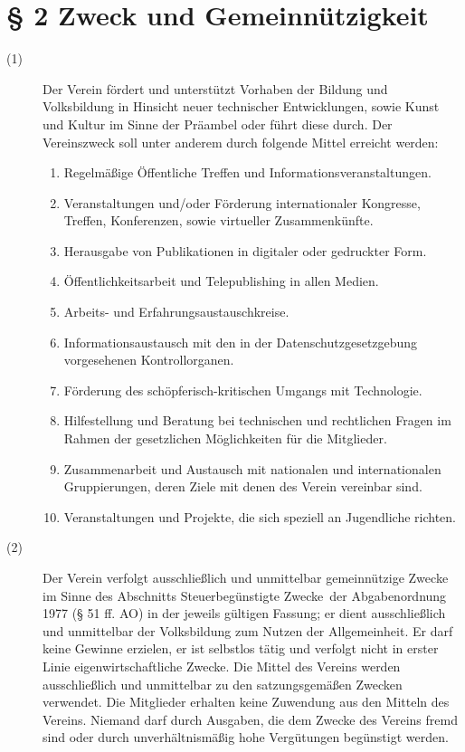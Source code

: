 \documentclass[12pt,paper=a4,ngerman]{scrreprt}
\begin{document}
\section{\S{} 2 Zweck und Gemeinnützigkeit}
\begin{description}
	\item[(1)] Der Verein fördert und unterstützt Vorhaben der Bildung und Volksbildung in Hinsicht neuer technischer Entwicklungen, sowie Kunst und Kultur im Sinne der Präambel oder führt diese durch. Der Vereinszweck soll unter anderem durch folgende Mittel erreicht werden:
	\begin{enumerate}
		\item Regelmäßige Öffentliche Treffen und Informationsveranstaltungen.
		\item Veranstaltungen und/oder Förderung internationaler Kongresse, Treffen, Konferenzen, sowie virtueller Zusammenkünfte.
		\item Herausgabe von Publikationen in digitaler oder gedruckter Form.
		\item Öffentlichkeitsarbeit und Telepublishing in allen Medien.
		\item Arbeits- und Erfahrungsaustauschkreise.
		\item Informationsaustausch mit den in der Datenschutzgesetzgebung vorgesehenen Kontrollorganen.
		\item Förderung des schöpferisch-kritischen Umgangs mit Technologie.
		\item Hilfestellung und Beratung bei technischen und rechtlichen Fragen im Rahmen der gesetzlichen Möglichkeiten für die Mitglieder.
		\item Zusammenarbeit und Austausch mit nationalen und internationalen Gruppierungen, deren Ziele mit denen des Verein vereinbar sind.
		\item Veranstaltungen und Projekte, die sich speziell an Jugendliche richten.
	\end{enumerate}
\item[(2)] Der Verein verfolgt ausschließlich und unmittelbar gemeinnützige Zwecke im Sinne des Abschnitts \glqq Steuerbegünstigte Zwecke\grqq ~der Abgabenordnung 1977 (§ 51 ff. AO) in der jeweils gültigen Fassung; er dient ausschließlich und unmittelbar der Volksbildung zum Nutzen der Allgemeinheit. Er darf keine Gewinne erzielen, er ist selbstlos tätig und verfolgt nicht in erster Linie eigenwirtschaftliche Zwecke. Die Mittel des Vereins werden ausschließlich und unmittelbar zu den satzungsgemäßen Zwecken verwendet. Die Mitglieder erhalten keine Zuwendung aus den Mitteln des Vereins. Niemand darf durch Ausgaben, die dem Zwecke des Vereins fremd sind oder durch unverhältnismäßig hohe Vergütungen begünstigt werden.
\end{description}
\end{document}
